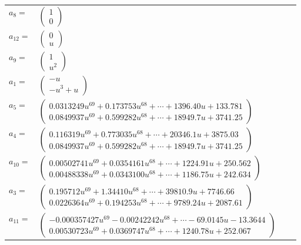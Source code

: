 \documentclass[1p]{elsarticle_modified}
\theoremstyle{definition}
\begin{document}
\begin{tabular}{m{7pt} m{180pt} m{7pt} m{180pt} }
\flushright $a_{8}=$&$\begin{pmatrix}1\\0\end{pmatrix}$ \\
\flushright $a_{12}=$&$\begin{pmatrix}0\\u\end{pmatrix}$ \\
\flushright $a_{9}=$&$\begin{pmatrix}1\\u^2\end{pmatrix}$ \\
\flushright $a_{1}=$&$\begin{pmatrix}- u\\- u^3+u\end{pmatrix}$ \\
\flushright $a_{5}=$&$\begin{pmatrix}0.0313249 u^{69}+0.173753 u^{68}+\cdots+1396.40 u+133.781\\0.0849937 u^{69}+0.599282 u^{68}+\cdots+18949.7 u+3741.25\end{pmatrix}$ \\
\flushright $a_{4}=$&$\begin{pmatrix}0.116319 u^{69}+0.773035 u^{68}+\cdots+20346.1 u+3875.03\\0.0849937 u^{69}+0.599282 u^{68}+\cdots+18949.7 u+3741.25\end{pmatrix}$ \\
\flushright $a_{10}=$&$\begin{pmatrix}0.00502741 u^{69}+0.0354161 u^{68}+\cdots+1224.91 u+250.562\\0.00488338 u^{69}+0.0343100 u^{68}+\cdots+1186.75 u+242.634\end{pmatrix}$ \\
\flushright $a_{3}=$&$\begin{pmatrix}0.195712 u^{69}+1.34410 u^{68}+\cdots+39810.9 u+7746.66\\0.0226364 u^{69}+0.194253 u^{68}+\cdots+9789.24 u+2087.61\end{pmatrix}$ \\
\flushright $a_{11}=$&$\begin{pmatrix}-0.000357427 u^{69}-0.00242242 u^{68}+\cdots-69.0145 u-13.3644\\0.00530723 u^{69}+0.0369747 u^{68}+\cdots+1240.78 u+252.067\end{pmatrix}$ \\

\end{tabular}
\end{document}
